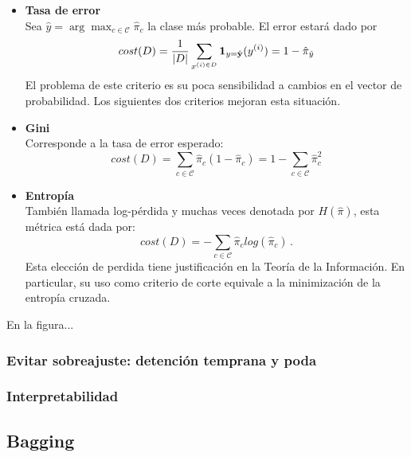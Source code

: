 \begin{itemize}
    \item \textbf{Tasa de error} \\
    Sea $\hat y = \arg\max_{c \in \mathcal{C}} \hat \pi_c$ la clase más probable. El error estará dado por
    \begin{equation}
        cost(D) = \frac{1}{|D|} \sum_{x^{(i) \in D}} \mathbf{1}_{y = \hat {\mathbf{y}}}(y^{(i)}) = 1 - \hat \pi_{\hat y}
    \end{equation}
    El problema de este criterio es su poca sensibilidad a cambios en el vector de probabilidad. Los siguientes dos criterios mejoran esta situación.

    \item \textbf{Gini} \\
    Corresponde a la tasa de error esperado:
    \begin{equation}
        cost(D) = \sum_{c \in \mathcal{C}} \hat \pi_c (1 - \hat \pi_c) = 1 - \sum_{c \in \mathcal{C}} \hat \pi_c^2
    \end{equation}

    \item \textbf{Entropía} \\
    También llamada log-pérdida y muchas veces denotada por $H(\hat \pi)$, esta métrica está dada por:
    \begin{equation}
        cost(D) = - \sum_{c \in \mathcal{C}} \hat \pi_c log(\hat \pi_c) \,.
    \end{equation}
    Esta elección de perdida tiene justificación en la Teoría de la Información. En particular, su uso como criterio de corte equivale a la minimización de la entropía cruzada.
\end{itemize}

En la figura...



\subsubsection{Evitar sobreajuste: detención temprana y poda}

\subsubsection{Interpretabilidad}


\subsection{Bagging}
\label{sec:bagging}

